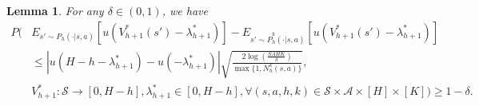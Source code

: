 \documentclass[11pt]{article}
\newtheorem{lemma}{Lemma}
\newcommand{\1}{\mathbbm{1}}
\begin{document}
\begin{lemma}\label{L3}
For any $\delta\in (0,1)$, we have
\begin{equation}\label{S2}
\begin{aligned}
P\Bigg (& E_{s'\sim P_h(\cdot\vert s,a)}\left [u(V_{h+1}^*(s')-\lambda_{h+1}^*)\right ]-E_{s'\sim \hat{P}^k_h(\cdot\vert s,a)}\left [u(V_{h+1}^*(s')-\lambda_{h+1}^*)\right ]\\
&\leq \left\vert u(H-h-\lambda_{h+1}^*)-u(-\lambda_{h+1}^*)\right\vert \sqrt{\frac{2\log(\frac{SAHK}{\delta})}{\max\{1,N^k_h(s,a)\}}},\\
&V_{h+1}^*:\mathcal{S}\to [0,H-h],\lambda_{h+1}^*\in [0,H-h],\forall (s,a,h,k)\in \mathcal{S}\times \mathcal{A}\times [H]\times [K]\Bigg)\geq 1-\delta.
\end{aligned}
\end{equation}
\end{lemma}
\end{document}
